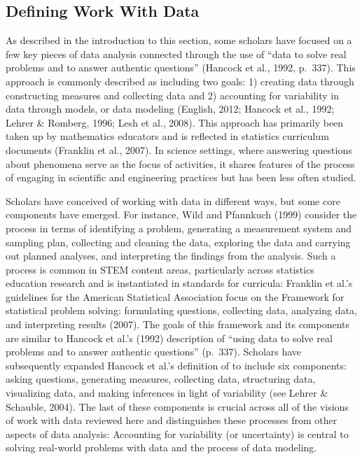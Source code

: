 \documentclass[]{msu-thesis}
\theoremstyle{definition}
\theoremstyle{definition}
\theoremstyle{definition}
\theoremstyle{remark}
\begin{document}
\subsection{Defining Work With Data}\label{defining-work-with-data}

As described in the introduction to this section, some scholars have
focused on a few key pieces of data analysis connected through the use
of ``data to solve real problems and to answer authentic questions''
(Hancock et al., 1992, p.~337). This approach is commonly described as
including two goals: 1) creating data through constructing measures and
collecting data and 2) accounting for variability in data through
models, or data modeling (English, 2012; Hancock et al., 1992; Lehrer \&
Romberg, 1996; Lesh et al., 2008). This approach has primarily been
taken up by mathematics educators and is reflected in statistics
curriculum documents (Franklin et al., 2007). In science settings, where
answering questions about phenomena serve as the focus of activities, it
shares features of the process of engaging in scientific and engineering
practices but has been less often studied.

Scholars have conceived of working with data in different ways, but some
core components have emerged. For instance, Wild and Pfannkuch (1999)
consider the process in terms of identifying a problem, generating a
measurement system and sampling plan, collecting and cleaning the data,
exploring the data and carrying out planned analyses, and interpreting
the findings from the analysis. Such a process is common in STEM content
areas, particularly across statistics education research and is
instantiated in standards for curricula: Franklin et al.'s guidelines
for the American Statistical Association focus on the Framework for
statistical problem solving: formulating questions, collecting data,
analyzing data, and interpreting results (2007). The goals of this
framework and its components are similar to Hancock et al.'s (1992)
description of ``using data to solve real problems and to answer
authentic questions'' (p.~337). Scholars have subsequently expanded
Hancock et al.'s definition of to include six components: asking
questions, generating measures, collecting data, structuring data,
visualizing data, and making inferences in light of variability (see
Lehrer \& Schauble, 2004). The last of these components is crucial
across all of the visions of work with data reviewed here and
distinguishes these processes from other aspects of data analysis:
Accounting for variability (or uncertainty) is central to solving
real-world problems with data and the process of data modeling.
\end{document}
